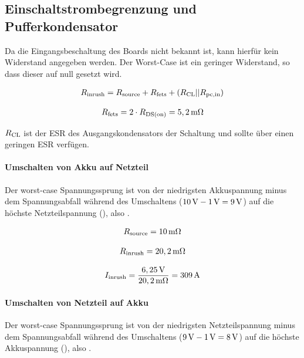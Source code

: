 \subsection{Einschaltstrombegrenzung und Pufferkondensator}

Da die Eingangsbeschaltung des Boards nicht bekannt ist, kann hierfür kein Widerstand angegeben werden. Der Worst-Case ist ein geringer Widerstand, so dass dieser auf null gesetzt wird.

\begin{align*}
	R_{\mathrm{inrush}} = R_{\mathrm{source}} + R_{\mathrm{fets}} + (R_{\mathrm{CL}} || R_{\mathrm{pc,in}})
\end{align*}

\begin{align*}
	R_{\mathrm{fets}} = 2 \cdot R_{\mathrm{DS(on)}} = 5,2\,\mathrm{m\Omega}
\end{align*}

$R_{\mathrm{CL}}$ ist der ESR des Ausgangskondensators der Schaltung und sollte über einen geringen ESR verfügen. 



\paragraph{Umschalten von Akku auf Netzteil}

Der worst-case Spannungssprung ist von der niedrigsten Akkuspannung minus dem Spannungsabfall während des Umschaltens ($10\,\mathrm{V} - 1\,\mathrm{V} = 9\,\mathrm{V}$) auf die höchste Netzteilspannung (), also .

\begin{align*}
	R_{\mathrm{source}} = 10\,\mathrm{m\Omega}
\end{align*}

\begin{align*}
	R_{\mathrm{inrush}} = 20,2\,\mathrm{m\Omega}
\end{align*}

\begin{align*}
	I_{\mathrm{inrush}} = \frac{6,25\,\mathrm{V}}{20,2\,\mathrm{m \Omega}} = 309\,\mathrm{A}
\end{align*}


\paragraph{Umschalten von Netzteil auf Akku}

Der worst-case Spannungssprung ist von der niedrigsten Netzteilspannung minus dem Spannungsabfall während des Umschaltens ($9\,\mathrm{V} - 1\,\mathrm{V} = 8\,\mathrm{V}$) auf die höchste Akkuspannung (), also .

